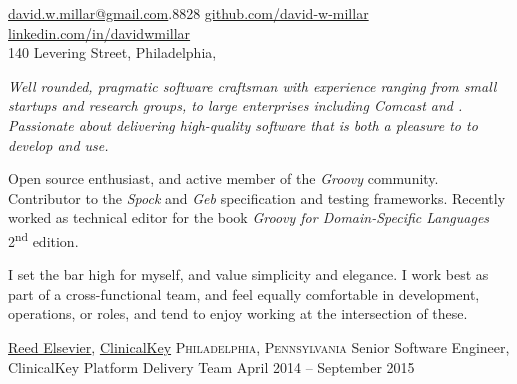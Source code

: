 \documentclass[10pt,a4paper]{article}
\begin{document}
\sloppy


\nobreakvspace{0.3em}  %
\noindent\href{mailto:david.w.millar.at.gmail.com}{david.w.millar\mbox{}@\mbox{}gmail.com}\hspace{1.7mm}.8828
\sbull
\href{http://www.github.com/david-w-millar}{github.com/david-w-millar}\sbull
\href{http://www.linkedin.com/in/davidwmillar}{linkedin.com/in/davidwmillar}
\\
140 Levering Street, Philadelphia,

\spacedhrule{0.9em}{-0.4em}


\vspace{-1.3em}  %
\begin{multicols}{2}  %
  \emph{
    Well rounded, pragmatic software craftsman with experience ranging from small startups and research groups, to large enterprises including Comcast and .
    Passionate about delivering high-quality software that is both a pleasure to to develop and use.
  }

Open source enthusiast, and active member of the \emph{Groovy} community.
Contributor to the \emph{Spock} and \emph{Geb} specification and testing frameworks.
Recently worked as technical editor for the book \emph{Groovy for Domain-Specific Languages}  2\textsuperscript{nd} edition.

I set the bar high for myself, and value simplicity and elegance.
I work best as part of a cross-functional team, and feel equally comfortable in development, operations, or  roles, and tend to enjoy working at the intersection of these.

\end{multicols}


\spacedhrule{0em}{-0.4em}


\headedsection
{\href{http://www.elsevier.com/}{Reed Elsevier}, \href{http://www.clinicalkey.com/}{ClinicalKey}}
  {\textsc{Philadelphia, Pennsylvania}} {%
  \headedsubsection
    {Senior Software Engineer, ClinicalKey Platform Delivery Team}
    {April 2014 -- September 2015}
    {}
}
\end{document}
